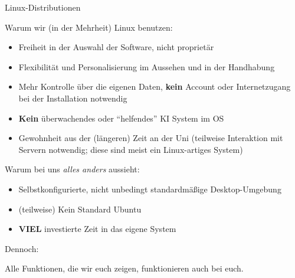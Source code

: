 \begin{frame}{Linux-Distributionen}



    Warum wir (in der Mehrheit) Linux benutzen:
    \begin{itemize}
        \item Freiheit in der Auswahl der Software, nicht proprietär
        \item Flexibilität und Personalisierung im Aussehen und in der Handhabung
        \item Mehr Kontrolle über die eigenen Daten, \textbf{kein} Account oder
          Internetzugang bei der Installation notwendig
        \item \textbf{Kein} überwachendes oder \enquote{helfendes} KI System im OS
        \item Gewohnheit aus der (längeren) Zeit an der Uni (teilweise Interaktion mit Servern
            notwendig; diese sind meist ein Linux-artiges System)
    \end{itemize}
    Warum bei uns \textit{alles anders} aussieht:
    \begin{itemize}
        \item Selbstkonfigurierte, nicht unbedingt standardmäßige Desktop-Umgebung
        \item (teilweise) Kein Standard Ubuntu
        \item \textbf{VIEL} investierte Zeit in das eigene System
    \end{itemize}

    Dennoch:

    Alle Funktionen, die wir euch zeigen, funktionieren auch bei euch.

\end{frame}
